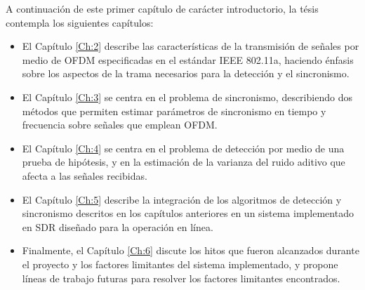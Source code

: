 A continuación de este primer capítulo de carácter introductorio, la tésis contempla los siguientes capítulos:
\begin{itemize}
    \item El Capítulo \ref{Ch:2} describe las características de la transmisión de señales por medio de OFDM especificadas en el estándar IEEE 802.11a, haciendo énfasis sobre los aspectos de la trama necesarios para la detección y el sincronismo.
    \item El Capítulo \ref{Ch:3} se centra en el problema de sincronismo, describiendo dos métodos que permiten estimar parámetros de sincronismo en tiempo y frecuencia sobre señales que emplean OFDM.
    \item El Capítulo \ref{Ch:4} se centra en el problema de detección por medio de una prueba de hipótesis, y en la estimación de la varianza del ruido aditivo que afecta a las señales recibidas.
    \item El Capítulo \ref{Ch:5} describe la integración de los algoritmos de detección y sincronismo descritos en los capítulos anteriores en un sistema implementado en SDR diseñado para la operación en línea.
    \item Finalmente, el Capítulo \ref{Ch:6} discute los hitos que fueron alcanzados durante el proyecto y los factores limitantes del sistema implementado, y propone líneas de trabajo futuras para resolver los factores limitantes encontrados.
\end{itemize}


